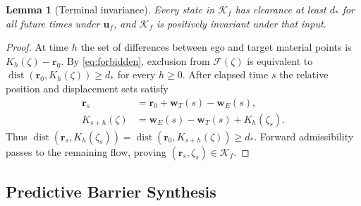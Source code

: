 \documentclass[journal]{IEEEtran}
\newtheorem{lemma}{Lemma}
\theoremstyle{definition}
\newcommand{\vct}[1]{\boldsymbol{#1}}
\begin{document}
\begin{lemma}[Terminal invariance]\label{lem:terminal}
Every state in $\mathcal K_f$ has clearance at least $d_*$ for all
future times under $\vct u_f$, and $\mathcal K_f$ is positively
invariant under that input.
\end{lemma}
\begin{proof}
At time $h$ the set of differences between ego and target material
points is $K_h(\zeta)-\vct r_0$. By \eqref{eq:forbidden}, exclusion
from $\mathcal F(\zeta)$ is equivalent to
$\operatorname{dist}(\vct r_0,K_h(\zeta))\ge d_*$ for every $h\ge0$.
After elapsed time $s$ the relative position and displacement sets satisfy
\begin{equation*}
\begin{aligned}
 \vct r_s&=\vct r_0+\vct w_T(s)-\vct w_E(s),\\
 K_{s+h}(\zeta)&=\vct w_E(s)-\vct w_T(s)+K_h(\zeta_s).
\end{aligned}
\end{equation*}
Thus $\operatorname{dist}(\vct r_s,K_h(\zeta_s))
=\operatorname{dist}(\vct r_0,K_{s+h}(\zeta))\ge d_*$.
Forward admissibility passes to the remaining flow, proving
$(\vct r_s,\zeta_s)\in\mathcal K_f$.
\end{proof}

\subsection{Predictive Barrier Synthesis}
\end{document}
